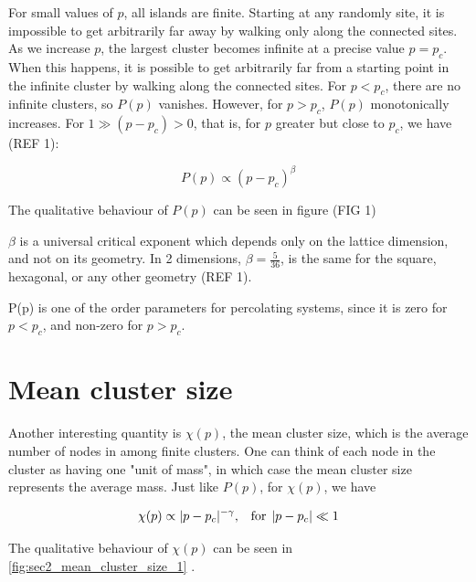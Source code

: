For small values of $p$, all islands are finite. Starting at any randomly site, it is impossible to get arbitrarily far away by walking only along the connected sites. As we increase $p$, the largest cluster becomes infinite at a precise value $p = p_c$. When this happens, it is possible to get arbitrarily far from a starting point in the infinite cluster by walking along the connected sites. For $p < p_c$, there are no infinite clusters, so $P(p)$ vanishes. However, for $p > p_c$, $P(p)$ monotonically increases. For $1 \gg (p - p_c) > 0$, that is, for $p$ greater  but close to $p_c$, we have (REF 1):

$$
    P(p) \propto (p - p_c)^\beta 
$$

The qualitative behaviour of $P(p)$ can be seen in figure (FIG 1)


$\beta$ is a universal critical exponent which depends only on the lattice dimension, and not on its geometry. In 2 dimensions, $\beta = \frac{5}{36}$, is the same for the square, hexagonal, or any other geometry (REF 1). 

P(p) is one of the order parameters for percolating systems, since it is zero for $p < p_c$, and non-zero for $p > p_c$.


\section{Mean cluster size}

Another interesting quantity is $\chi(p)$, the mean cluster size, which is the average number of nodes in among finite clusters. One can think of each node in the cluster as having one "unit of mass", in which case the mean cluster size represents the average mass. Just like $P(p)$, for $\chi(p)$, we have

$$ 
    \chi(p) \propto  |p - p_c|^{-\gamma} \textrm{,} \hspace{0.35cm}  \textrm{for} \hspace{0.15cm} |p - p_c| \ll 1 
$$ 

The qualitative behaviour of $\chi(p)$ can be seen in \autoref{fig:sec2_mean_cluster_size_1}
.

